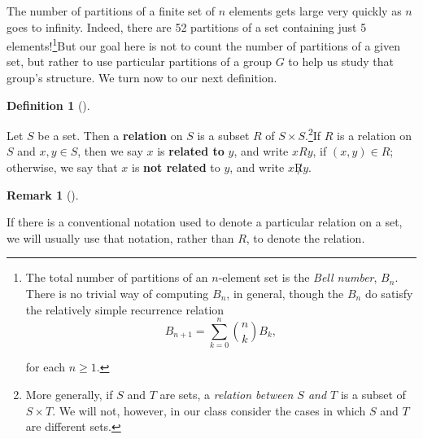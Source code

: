 \documentclass[10pt,]{book}
\newcommand{\terminology}[1]{\textbf{#1}}
\theoremstyle{plain}
\theoremstyle{definition}
\newtheorem{definition}[theorem]{Definition}
\theoremstyle{definition}
\newtheorem{remark}[theorem]{Remark}
\theoremstyle{definition}
\theoremstyle{definition}
\numberwithin{equation}{section}
\begin{document}
    The number of partitions of a finite set of \(n\) elements gets
    large very quickly as \(n\) goes to infinity. Indeed, there are 52
    partitions of a set containing just 5 elements!\footnote{The total
    number of partitions of an \(n\)-element set is the \emph{Bell number},
    \(B_n\). There is no trivial way of computing \(B_n\), in general,
    though the \(B_n\) do satisfy the relatively simple recurrence
    relation
\begin{equation*}

      B_{n+1}=\sum_{k=0}^n \binom{n}{k} B_k,
    
\end{equation*}

    for each \(n\geq 1\).\label{fn-2}}But our goal here is not to count the number of
    partitions of a given set, but rather to use particular partitions
    of a group \(G\) to help us study that group's structure. We turn now
    to our next definition.
\begin{definition}[{}]\label{definition-54}

        Let \(S\) be a set. Then a \terminology{relation} on \(S\) is a
        subset \(R\) of \(S\times S\).\footnote{More generally, if \(S\) and
        \(T\) are sets, a \emph{relation between \(S\) and \(T\)} is a subset
        of \(S \times T\). We will not, however, in our class consider
        the cases in which \(S\) and \(T\) are different sets.\label{fn-3}}If \(R\) is
        a relation on \(S\) and \(x,y\in S\), then we say \(x\) is \terminology{related to} \(y\), and write \(x R y\), if \((x,y)\in R\);
        otherwise, we say that \(x\) is \terminology{not related} to \(y\), and
        write \(x \not R y\).
\label{notation-61}
\label{notation-62}
\end{definition}
\begin{remark}[]\label{remark-34}

      If there is a conventional notation used to denote
      a particular relation on a set, we will usually use that notation,
      rather than \(R\), to denote the relation.
\end{remark}
\par
\end{document}
